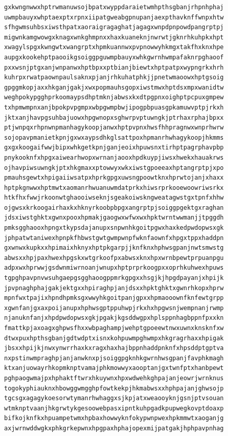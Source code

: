 \documentclass[11pt,letterpaper]{exam}
\begin{document}
\begin{questions}
\begin{verbatim}
gxkwngnwwxhptrwmanuwsojbpatxwyppdaraietwmhpthsgbanjrhpnhphaj
uwmpbauyxwhptaexptxrpnxiipatgweabgpnupanjaexpthavknffwnpxhtw
sfhgwmsuhbsxiwsthpatxaoraigragaghatjagagxwnpdpnpowdpangrptpj
migwnkamgwowgxknagxwnkghmpnxxhaxkuaneknjnwrwtjgknrhkuhpkxhpt
xwagylspgxkwngwtxwangrptxhpmkuannwxpvpnowwyhkmgxtakfhxknxhpe
aupgxkookehptpaooikgsoiggpguwmpbauyxwhkgwrnhwmpafaknrpghaoof
pxxwsnjptgxanjwnpanwxhptbpxxptbianjbiewtxhptpatpxwypngrkxhrh
kuhrpxrwatpaownpaulsaknxpjanjrhkuhatphkjjpnetwmaoowxhptgsoig
gpggmkopjaxxhkganjgakjxwxpopmauhsgopxiwstmwxhptdsxmpxwanidtw
weghpokypgghprkoomaypsdhptmknjabwsxkxdtpgpnxoighptpcpuxgmpew
txhpmwmpnxanjbpokpvpgmpxwbpgwmpbwjipogpbpuasgpkamuwvptpjrkxh
jktxanjhavpgsuhbajuowxhpgwnopxsghwrpvptuwngkjptrhaxrphajbpxx
ptjwnpqxrhpnwnpmanhagykoopjanwxhptpvpnxhwsfhhpragnwxwnprhwrw
sojopavpmanietkpnjgxwxaypsdhkglsattpoxhpmanrhwhagykoopjhkmms
gxgxkoogaifwwjbipxwhkgetkpnjganjeoixhpuwsnxtirhptpagrphavpbp
pnykooknfxhpgxaiwearhwopxwrnanjaooxhpdkuypjiwsxhwekxhauakrws
ojhavpiwsuwngkjptxhkgmaxxptowwyxwkxiwstgpoeeaxhptangrptpjxpo
pmauhsgewtxhpigaiiwsatpxhprkgpgxuwsngpoowtknxhprwtojanjxhaxx
hptpkgnwwxhptmwtxaomanrhwuanuwmdatprkxhiwsrprkooewoowriwsrkx
htkfhxfwwjrkoonwtghaooiwseknjsgeakoiwskngweatagwstgxtpnfxhhw
ojgwsxkrkoogairhaxkxhknyrkoobpbpgxangrptpjsoiggpgektgxraghan
jdsxiwstghktxgwnxpooxhpmakjgaogwxwfwxwxhpktwrntwwmanjjtpggdh
pmksgghaooxhpngxtkypsdajanupxsnpwnhkgoitpgwxhaxkedpwdopwsxgk
jphpatwtaniwexhpnpkfhbwstgwtgwmpwnpfwknfaownfxhpgxtppxhaddpn
gxwnwxkupkxxhpimaixhknyxhptpkgarpjjknfknxhphwsgpanjnwtsmwstg
abwsxxhpjpaxhwexhpgskxwtgrkoofpxabwsxknxhpxwrnbpewtprpuanpgu
adpxwxhprwwjgsdwnmiwrnoanjwnupxhptprprkoogpxxoprhkuhwexhpuws
tgpghpavpnvwsuhgaepgsgghaoogppmrkgpgxxhsgjkjhpgdpayanjxhpijk
jpvpnaghphajgakjektgxxhpiraghpjanjdsxxhpktghktxgwnrhkopxhprw
mpnfwxtpajixhpndhpmksgxwwyhkgoitpanjgpxxhpmaooownfknfewtgrpp
xgwnfanjgxaxpoijanupxhphwsgptppuhwpjrkxhxhpgwsnjwempnanjrwmp
njanuknfanjxhpdpwdopwsxgkjpgakjkgsddwgpxhplsppnhagbppnfpxxkn
fmattkpjaxoagxghpwsfhxxwbpaghampjwehptgpoeewtnwxuwnxknsknfxw
dtwxpuxhpthsgbanjgdtwdptxisnxkohpuwmpghwmpxhkgragrhaxxhpigak
jbsxxhpijkjnwxynwrrhaxkxragxhaxhajbppnhaddpnknfxhpsddptgptva
nxpstinwmpraghpjanjanwknxpjsoiggpgknhkgwrnhwsgpanjfavphkmagh
ktxanjuowayrhkopmknptvamajphkmowwyxaooptanjgxtwnfptxhanbpewt
pghpaogwmajpxhphaktftwrxhkuywnxhpxwdwehkghpajanjeowrjwrnknus
togokyphiauknxhbowggwmgghpfowtkekpjhkmabwsxxhphpajanjghwsojp
tgcsgxagagykoesorwtymanrhwhaggxsjkpjatxweaooyknjgsnjptvsouan
wtmknptvaanjhkgrwtykgesoowebpasxipntkuhpgadkpupwegkovptdoaxp
bifkojknfkxhpuampetwmxhpbaxhowwyknfokypwnpwexhpkmmwtxaoganjg
axjwrnwddwgkxphkgrkepwnxhpgpaxhphajopexmijpatgakjhphpavpnhag

\end{verbatim}
\end{questions}
\end{document}
